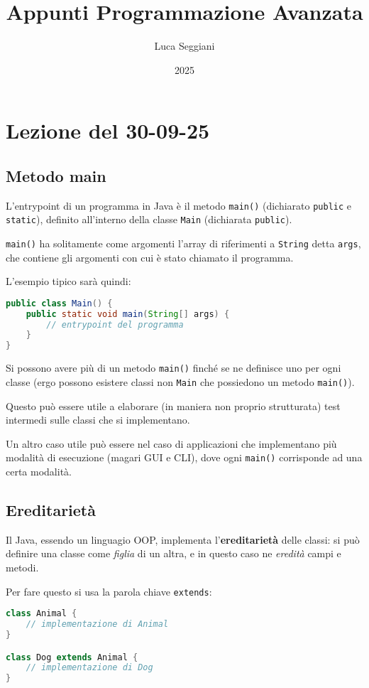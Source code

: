 \documentclass[a4paper,11pt]{article}
\title{Appunti Programmazione Avanzata}
\author{Luca Seggiani}
\date{2025}
\begin{document}
\section{Lezione del 30-09-25}

\thispagestyle{empty}
\pagestyle{fancy}

\subsection{Metodo main}
L'entrypoint di un programma in Java è il metodo \lstinline|main()| (dichiarato \lstinline|public| e \lstinline|static|), definito all'interno della classe \lstinline|Main| (dichiarata \lstinline|public|).

\lstinline|main()| ha solitamente come argomenti l'array di riferimenti a \lstinline|String| detta \lstinline|args|, che contiene gli argomenti con cui è stato chiamato il programma.

L'esempio tipico sarà quindi:
\begin{lstlisting}[language=java, style=codestyle]	
public class Main() {
	public static void main(String[] args) {
		// entrypoint del programma 
	}
}
\end{lstlisting}

Si possono avere più di un metodo \lstinline|main()| finché se ne definisce uno per ogni classe (ergo possono esistere classi non \lstinline|Main| che possiedono un metodo \lstinline|main()|).

Questo può essere utile a elaborare (in maniera non proprio strutturata) test intermedi sulle classi che si implementano.

Un altro caso utile può essere nel caso di applicazioni che implementano più modalità di esecuzione (magari GUI e CLI), dove ogni \lstinline|main()| corrisponde ad una certa modalità.

\subsection{Ereditarietà}
Il Java, essendo un linguagio OOP, implementa l'\textbf{ereditarietà} delle classi: si può definire una classe come \textit{figlia} di un altra, e in questo caso ne \textit{eredità} campi e metodi.

Per fare questo si usa la parola chiave \lstinline|extends|:
\begin{lstlisting}[language=java, style=codestyle]	
class Animal {
	// implementazione di Animal
}

class Dog extends Animal {
	// implementazione di Dog
}
\end{lstlisting}
\end{document}

